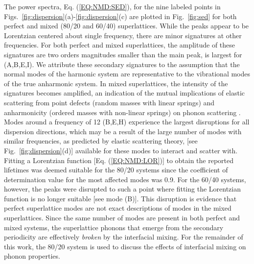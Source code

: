 The power spectra, Eq. (\ref{EQ:NMD:SED}), for the nine labeled points in Figs.~\ref{fig:dispersion}(a)-\ref{fig:dispersion}(c) are plotted in Fig.~\ref{fig:sed} for both perfect and mixed (80/20 and 60/40) superlattices. While the peaks appear to be Lorentzian centered about single frequency, there are minor signatures at other frequencies. For both perfect and mixed superlattices, the amplitude of these signatures are two orders magnitudes smaller than the main peak, is largest for (A,B,E,I). We attribute these secondary signatures to the assumption that the normal modes of the harmonic system are representative to the vibrational modes of the true anharmonic system. In mixed superlattices, the intensity of the signatures becomes amplified, an indication of the mutual implications of elastic scattering from point defects (random masses with linear springs) and anharmonicity (ordered masses with non-linear springs) on phonon scattering \cite{RevModPhys.53.175}. Modes around a frequency of 12 (B,E,H) experience the largest disruptions for all dispersion directions, which may be a result of the large number of modes with similar frequencies, as predicted by elastic scattering theory, [see Fig.~\ref{fig:dispersion}(d)] available for these modes to interact and scatter with.\cite{tamura_isotope_1983} Fitting a Lorentzian function [Eq. (\ref{EQ:NMD:LOR})] to obtain the reported lifetimes was deemed suitable for the 80/20 systems since the coefficient of determination value \cite{Cowpe20081066} for the most affected modes was 0.9. For the 60/40 systems, however, the peaks were disrupted to such a point where fitting the Lorentzian function is no longer suitable [see mode (B)]. This disruption is evidence that perfect superlattice modes are not exact descriptions of modes in the mixed superlattices. Since the same number of modes are present in both perfect and mixed systems, the superlattice phonons that emerge from the secondary periodicity are effectively \textit{broken} by the interfacial mixing. For the remainder of this work, the 80/20 system is used to discuss the effects of interfacial mixing on phonon properties.

